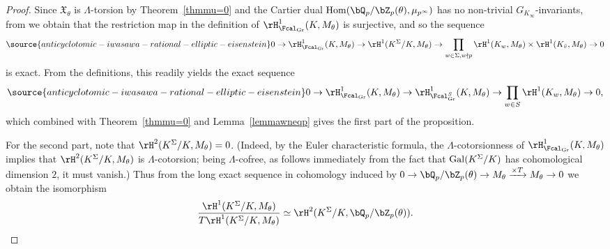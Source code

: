 \begin{proof}
Since $\mathfrak{X}_{\theta}$ is $\Lambda$-torsion by Theorem~\ref{thmmu=0} and the Cartier dual ${\rm Hom}(\bQ_p/\bZ_p(\theta),\mu_{p^\infty})$ has no non-trivial $G_{K_\infty}$-invariants, from \cite[Prop.~A.2]{pollack2011anticyclotomic} we obtain that the restriction map in the definition of $\rH^{1}_{\Fcal_{\rm Gr}}(K,M_\theta)$ is surjective, and so the sequence
\begin{equation}\label{eq:sur1}
\source{anticyclotomic-iwasawa-rational-elliptic-eisenstein}
 0 \rightarrow \rH^{1}_{\Fcal_{\rm Gr}}(K,M_\theta) \rightarrow\rH^{1}(K^{\Sigma}/K, M_\theta) \rightarrow \prod_{w\in\Sigma, w\nmid p}\rH^1(K_w,M_\theta) \times \rH^{1}(K_{\bar{v}}, M_\theta)\rightarrow 0
\end{equation}
is exact. From the definitions, this readily yields the exact sequence
\begin{equation}\label{eq:sur2}
\source{anticyclotomic-iwasawa-rational-elliptic-eisenstein}
0 \rightarrow\rH^{1}_{\Fcal_{\rm Gr}}(K,M_\theta) \rightarrow\rH^{1}_{\Fcal_{\rm Gr}^S}(K,M_\theta) \rightarrow \prod_{w\in S}\rH^1(K_w,M_\theta) \rightarrow 0,
\end{equation}
which combined with Theorem~\ref{thmmu=0} and Lemma~\ref{lemmawneqp}  gives the first part of the proposition.

For the second part, note that $\rH^{2}(K^{\Sigma}/K,M_\theta)=0$. (Indeed, by the Euler characteristic formula, the $\Lambda$-cotorsionness of $\rH^{1}_{\Fcal_{\rm Gr}}(K,M_\theta)$ implies that $\rH^{2}(K^{\Sigma}/K,M_\theta)$ is $\Lambda$-cotorsion; being $\Lambda$-cofree, as follows immediately from the fact that ${\rm Gal}(K^\Sigma/K)$ has cohomological dimension $2$, it must vanish.) Thus from the long exact sequence in cohomology induced by
$0\rightarrow \bQ_p/\bZ_p(\theta)\rightarrow M_\theta\xrightarrow{\times T}M_\theta\rightarrow 0$
we obtain the isomorphism
\[
\frac{\rH^{1}(K^{\Sigma}/K,M_\theta)}{T\rH^{1}(K^{\Sigma}/K,M_\theta)} \simeq\rH^{2}(K^{\Sigma}/K,\bQ_p/\bZ_p(\theta)).
\]


\end{proof}
